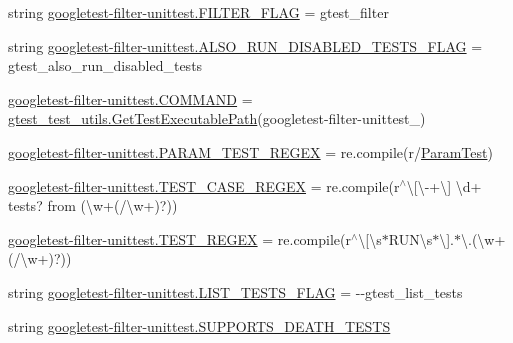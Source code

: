 \begin{DoxyCompactItemize}
string \mbox{\hyperlink{namespacegoogletest-filter-unittest_ac1f80cdfddece685ad526019b12fe2e3}{googletest-\/filter-\/unittest.\+F\+I\+L\+T\+E\+R\+\_\+\+F\+L\+AG}} = \textquotesingle{}gtest\+\_\+filter\textquotesingle{}
\item 
string \mbox{\hyperlink{namespacegoogletest-filter-unittest_abf498ba8de8ed89f11e552d89108a79f}{googletest-\/filter-\/unittest.\+A\+L\+S\+O\+\_\+\+R\+U\+N\+\_\+\+D\+I\+S\+A\+B\+L\+E\+D\+\_\+\+T\+E\+S\+T\+S\+\_\+\+F\+L\+AG}} = \textquotesingle{}gtest\+\_\+also\+\_\+run\+\_\+disabled\+\_\+tests\textquotesingle{}
\item 
\mbox{\hyperlink{namespacegoogletest-filter-unittest_a0d1ea907e2ca14e1335cbf270df41bac}{googletest-\/filter-\/unittest.\+C\+O\+M\+M\+A\+ND}} = \mbox{\hyperlink{namespacegtest__test__utils_a89ed3717984a80ffbb7a9c92f71b86a2}{gtest\+\_\+test\+\_\+utils.\+Get\+Test\+Executable\+Path}}(\textquotesingle{}googletest-\/filter-\/unittest\+\_\+\textquotesingle{})
\item 
\mbox{\hyperlink{namespacegoogletest-filter-unittest_af77bfd6536a2e3193efc40a697c0d973}{googletest-\/filter-\/unittest.\+P\+A\+R\+A\+M\+\_\+\+T\+E\+S\+T\+\_\+\+R\+E\+G\+EX}} = re.\+compile(r\textquotesingle{}/\mbox{\hyperlink{class_param_test}{Param\+Test}}\textquotesingle{})
\item 
\mbox{\hyperlink{namespacegoogletest-filter-unittest_a7a56afb8dd8204a811746ffe2ae508cb}{googletest-\/filter-\/unittest.\+T\+E\+S\+T\+\_\+\+C\+A\+S\+E\+\_\+\+R\+E\+G\+EX}} = re.\+compile(r\textquotesingle{}$^\wedge$\textbackslash{}\mbox{[}\textbackslash{}-\/+\textbackslash{}\mbox{]} \textbackslash{}d+ tests? from (\textbackslash{}w+(/\textbackslash{}w+)?)\textquotesingle{})
\item 
\mbox{\hyperlink{namespacegoogletest-filter-unittest_aa92cd55f293bfe9c69a9cfcd12f2486d}{googletest-\/filter-\/unittest.\+T\+E\+S\+T\+\_\+\+R\+E\+G\+EX}} = re.\+compile(r\textquotesingle{}$^\wedge$\textbackslash{}\mbox{[}\textbackslash{}s$\ast$R\+U\+N\textbackslash{}s$\ast$\textbackslash{}\mbox{]}.$\ast$\textbackslash{}.(\textbackslash{}w+(/\textbackslash{}w+)?)\textquotesingle{})
\item 
string \mbox{\hyperlink{namespacegoogletest-filter-unittest_a74c619e65e9f5ff467438c37936138d1}{googletest-\/filter-\/unittest.\+L\+I\+S\+T\+\_\+\+T\+E\+S\+T\+S\+\_\+\+F\+L\+AG}} = \textquotesingle{}-\/-\/gtest\+\_\+list\+\_\+tests\textquotesingle{}
\item 
string \mbox{\hyperlink{namespacegoogletest-filter-unittest_a5aaa3e6381c05a68e780b8050e524644}{googletest-\/filter-\/unittest.\+S\+U\+P\+P\+O\+R\+T\+S\+\_\+\+D\+E\+A\+T\+H\+\_\+\+T\+E\+S\+TS}}

\end{DoxyCompactItemize}
